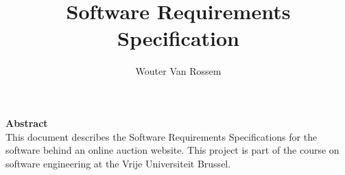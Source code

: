 \documentclass{report}
\begin{document}
\title{Software Requirements Specification}
\author{Wouter Van Rossem}

\maketitle
\begin{center}
	\textbf{Abstract} \\
	This document describes the Software Requirements Specifications for
	the software behind an online auction website. This project is part of 
	the course on software engineering at the Vrije Universiteit Brussel.
\end{center}
\tableofcontents








\end{document}
